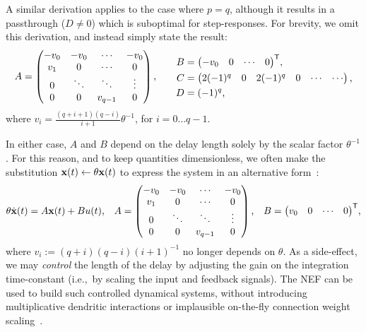 A similar derivation applies to the case where $p = q$, although it results in a passthrough ($D \ne 0$) which is suboptimal for step-responses.
For brevity, we omit this derivation, and instead simply state the result:
\begin{equation*}
    \begin{alignedat}{2}
        A &= \begin{pmatrix} -v_0 & -v_0 & \cdots & -v_0 \\ v_1 & 0 & \cdots & 0 \\ 0 & \ddots & \ddots & \vdots \\ 0 & 0 & v_{q-1} & 0\end{pmatrix} \text{,} & & \quad\quad \begin{alignedat}{1}
            B &= {\begin{pmatrix}-v_0 & 0 & \cdots & 0\end{pmatrix}}^\mathsf{T} \text{,} \\
            C &= \begin{pmatrix} 2(-1)^q & 0 & 2(-1)^q & 0 & \cdots & \cdots \end{pmatrix} \text{,} \\
            D &= (-1)^q \text{,}
        \end{alignedat}
    \end{alignedat}
\end{equation*}
where $v_i = \frac{(q+i+1)(q-i)}{i+1} \theta^{-1}$, for $i = 0 \ldots q-1$.

In either case, $A$ and $B$ depend on the delay length solely by the scalar factor $\theta^{-1}$.
For this reason, and to keep quantities dimensionless, we often make the substitution $\mathbf{x}(t) \leftarrow \theta\mathbf{x}(t)$ to express the system in an alternative form~\citep{braindrop2019}:
\begin{equation} \label{eq:delay-system}
  \theta \dot{\mathbf{x}}(t) = A\mathbf{x}(t) + Bu(t) \text{,} \quad
  A = \begin{pmatrix} -v_0 & -v_0 & \cdots & -v_0 \\ v_1 & 0 & \cdots & 0 \\ 0 & \ddots & \ddots & \vdots \\ 0 & 0 & v_{q-1} & 0\end{pmatrix} \text{,} \quad 
  B = {\begin{pmatrix} v_0 & 0 & \cdots & 0\end{pmatrix}}^\mathsf{T} \text{,} 
\end{equation}
where $v_i := (q+i)(q-i)(i+1)^{-1}$ no longer depends on $\theta$. %
As a side-effect, we may \emph{control} the length of the delay by adjusting the gain on the integration time-constant (i.e.,~by scaling the input and feedback signals).
The NEF can be used to build such controlled dynamical systems, without introducing multiplicative dendritic interactions or implausible on-the-fly connection weight scaling~\citep{eliasmith2000b}.

